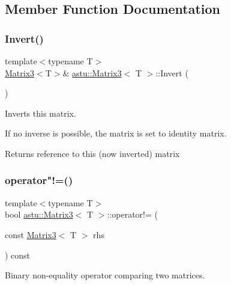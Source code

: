 \subsection{Member Function Documentation}
\mbox{\label{classastu_1_1Matrix3_a759cae68ce89b24da8fe1d79bae88e37}} 
\subsubsection{\texorpdfstring{Invert()}{Invert()}}
{\footnotesize\ttfamily template$<$typename T$>$ \\
\hyperlink{classastu_1_1Matrix3}{Matrix3}$<$T$>$\& \hyperlink{classastu_1_1Matrix3}{astu\+::\+Matrix3}$<$ T $>$\+::Invert (\begin{DoxyParamCaption}{ }\end{DoxyParamCaption})\hspace{0.3cm}{\ttfamily [inline]}}

Inverts this matrix.

If no inverse is possible, the matrix is set to identity matrix.

\begin{DoxyReturn}{Returns}
reference to this (now inverted) matrix 
\end{DoxyReturn}
\mbox{\label{classastu_1_1Matrix3_a3e60f2c37f594244cdb23994c27b264e}} 
\subsubsection{\texorpdfstring{operator"!=()}{operator!=()}}
{\footnotesize\ttfamily template$<$typename T$>$ \\
bool \hyperlink{classastu_1_1Matrix3}{astu\+::\+Matrix3}$<$ T $>$\+::operator!= (\begin{DoxyParamCaption}\item[{const \hyperlink{classastu_1_1Matrix3}{Matrix3}$<$ T $>$}]{rhs }\end{DoxyParamCaption}) const\hspace{0.3cm}{\ttfamily [inline]}}

Binary non-\/equality operator comparing two matrices.


